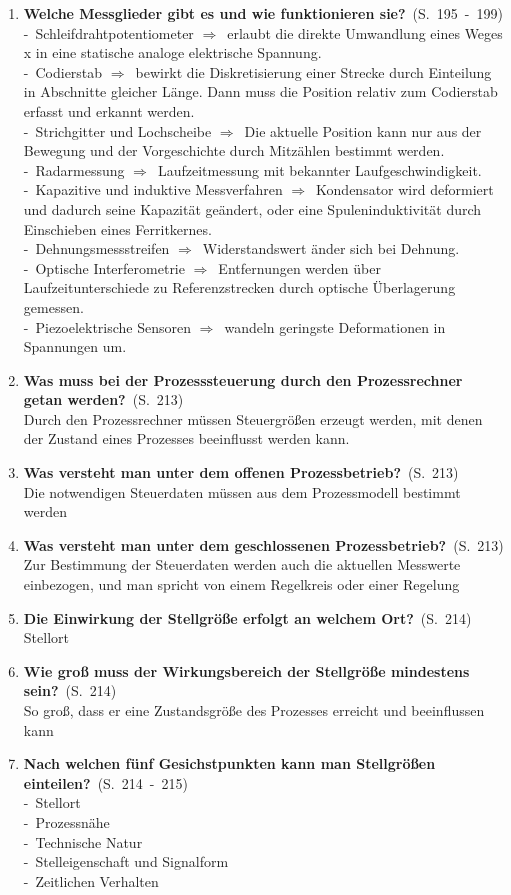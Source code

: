 \documentclass[a4paper,12pt]{article}
\newcommand{\question}[3]{\pagebreak[3]\item {\textbf{#1?}}\ (S.\ #2)#3}
\newcommand{\catchword}[1]{\\-\ #1}
\newcommand{\normaltext}[1]{\\#1}
\newcommand{\resultol}[1]{$\Rightarrow$\ #1}
\newcommand{\page}[1]{#1}
\newcommand{\pages}[2]{#1\ -\ #2}
\begin{document}
\begin{enumerate}
  \question{Welche Messglieder gibt es und wie funktionieren sie}{\pages{195}{199}}
  {
    \catchword{Schleifdrahtpotentiometer \resultol{erlaubt die direkte Umwandlung eines Weges x in
               eine statische analoge elektrische Spannung.}}
    \catchword{Codierstab \resultol{bewirkt die Diskretisierung einer Strecke durch Einteilung in Abschnitte 
               gleicher Länge. Dann muss die Position relativ zum Codierstab erfasst und erkannt werden.}}
    \catchword{Strichgitter und Lochscheibe \resultol{Die aktuelle Position kann nur aus der Bewegung und der 
               Vorgeschichte durch Mitzählen bestimmt werden.}}
    \catchword{Radarmessung \resultol{Laufzeitmessung mit bekannter Laufgeschwindigkeit.}}
    \catchword{Kapazitive und induktive Messverfahren \resultol{Kondensator wird deformiert und dadurch seine
               Kapazität geändert, oder eine Spuleninduktivität durch Einschieben eines Ferritkernes.}}
    \catchword{Dehnungsmessstreifen \resultol{Widerstandswert änder sich bei Dehnung.}}
    \catchword{Optische Interferometrie \resultol{Entfernungen werden über Laufzeitunterschiede
               zu Referenzstrecken durch optische Überlagerung gemessen.}}
    \catchword{Piezoelektrische Sensoren \resultol{wandeln geringste Deformationen in Spannungen um.}}
  }

  \question{Was muss bei der Prozesssteuerung durch den Prozessrechner getan werden}{\page{213}}
  {
    \normaltext{Durch den Prozessrechner müssen Steuergrößen erzeugt werden, mit denen der Zustand
                eines Prozesses beeinflusst werden kann.}
  }

  \question{Was versteht man unter dem offenen Prozessbetrieb}{\page{213}}
  {
    \normaltext{Die notwendigen Steuerdaten müssen aus dem Prozessmodell bestimmt werden}
  }

  \question{Was versteht man unter dem geschlossenen Prozessbetrieb}{\page{213}}
  {
    \normaltext{Zur Bestimmung der Steuerdaten werden auch die aktuellen Messwerte einbezogen,
                und man spricht von einem Regelkreis oder einer Regelung}
  }

  \question{Die Einwirkung der Stellgröße erfolgt an welchem Ort}{\page{214}}
  {
    \normaltext{Stellort}
  }

  \question{Wie groß muss der Wirkungsbereich der Stellgröße mindestens sein}{\page{214}}
  {
    \normaltext{So groß, dass er eine Zustandsgröße des Prozesses erreicht und
                beeinflussen kann}
  }

  \question{Nach welchen fünf Gesichstpunkten kann man Stellgrößen einteilen}{\pages{214}{215}}
  {
    \catchword{Stellort}
    \catchword{Prozessnähe}
    \catchword{Technische Natur}
    \catchword{Stelleigenschaft und Signalform}
    \catchword{Zeitlichen Verhalten}
  }


\end{enumerate}
\end{document}
